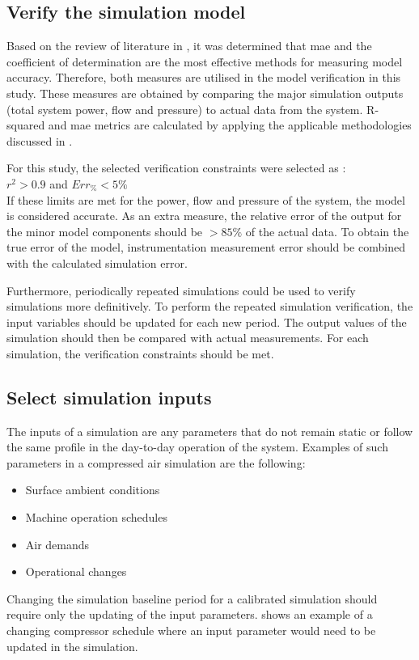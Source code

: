 	\subsection{Verify the simulation model}
	Based on the review of literature in , it was determined that \gls{mae} and the coefficient of determination are the most effective methods for measuring model accuracy. Therefore, both measures are utilised in the model verification in this study. These measures are obtained by comparing the major simulation outputs (total system power, flow and pressure) to actual data from the system. R-squared and \gls{mae} metrics are calculated by applying the applicable methodologies discussed in .	
	\par 
	For this study, the selected verification constraints were selected as : \\ {$r^2 > 0.9 $ and $ Err_{\%} < 5\% $}\\ 
	If these limits are met for the power, flow and pressure of the system, the model is considered accurate. As an extra measure, the relative error of the output for the minor model components should be $ > 85\%$ of the actual data. To obtain the true error of the model, instrumentation measurement error should be combined with the calculated simulation error.
	\par 
	Furthermore, periodically repeated simulations could be used to verify simulations more definitively. To perform the repeated simulation verification, the input variables should be updated for each new period. The output values of the simulation should then be compared with actual measurements. For each simulation, the verification constraints should be met.
		
	\subsection{Select simulation inputs}
		The inputs of a simulation are any parameters that do not remain static or follow the same profile in the day-to-day operation of the system. Examples of such parameters in a compressed air simulation are the following:
		\begin{itemize}
			\item Surface ambient conditions
			\item Machine operation schedules
			\item Air demands
			\item Operational changes
		\end{itemize} 
	Changing the simulation baseline period for a calibrated simulation should require only the updating of the input parameters.  shows an example of a changing compressor schedule where an input parameter would need to be updated in the simulation.	

